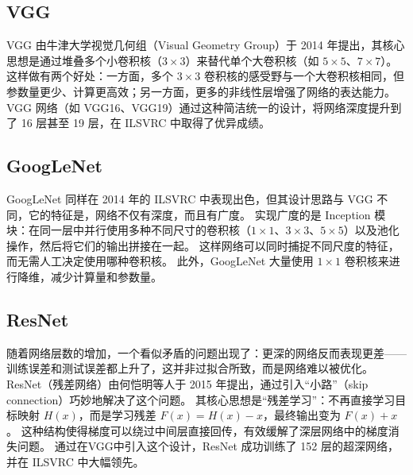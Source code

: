 \subsection{VGG}
VGG 由牛津大学视觉几何组（Visual Geometry Group）于 2014 年提出，其核心思想是通过堆叠多个小卷积核（$3 \times 3$）来替代单个大卷积核（如 $5 \times 5$、$7 \times 7$）。
这样做有两个好处：一方面，多个 $3 \times 3$ 卷积核的感受野与一个大卷积核相同，但参数量更少、计算更高效；另一方面，更多的非线性层增强了网络的表达能力。
VGG 网络（如 VGG16、VGG19）通过这种简洁统一的设计，将网络深度提升到了 16 层甚至 19 层，在 ILSVRC 中取得了优异成绩。

\subsection{GoogLeNet}
GoogLeNet 同样在 2014 年的 ILSVRC 中表现出色，但其设计思路与 VGG 不同，它的特征是，网络不仅有深度，而且有广度。
实现广度的是 Inception 模块：在同一层中并行使用多种不同尺寸的卷积核（$1 \times 1$、$3 \times 3$、$5 \times 5$）以及池化操作，然后将它们的输出拼接在一起。
这样网络可以同时捕捉不同尺度的特征，而无需人工决定使用哪种卷积核。
此外，GoogLeNet 大量使用 $1 \times 1$ 卷积核来进行降维，减少计算量和参数量。

\subsection{ResNet}
随着网络层数的增加，一个看似矛盾的问题出现了：更深的网络反而表现更差——训练误差和测试误差都上升了，这并非过拟合所致，而是网络难以被优化。
ResNet（残差网络）由何恺明等人于 2015 年提出，通过引入“小路”（skip connection）巧妙地解决了这个问题。
其核心思想是“残差学习”：不再直接学习目标映射 $H(x)$，而是学习残差 $F(x) = H(x) - x$，最终输出变为 $F(x) + x$。
这种结构使得梯度可以绕过中间层直接回传，有效缓解了深层网络中的梯度消失问题。
通过在VGG中引入这个设计，ResNet 成功训练了 152 层的超深网络，并在 ILSVRC 中大幅领先。
